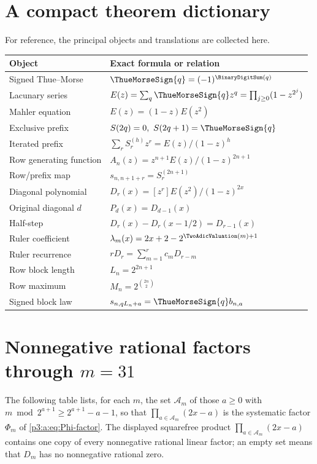 \documentclass[11pt,oneside]{article}
\numberwithin{equation}{section}
\theoremstyle{definition}
\theoremstyle{remark}
\begin{document}
\section{A compact theorem dictionary}\label{p3:app:dictionary}

For reference, the principal objects and translations are collected here.

\begin{center}
\begin{tabularx}{\textwidth}{@{}p{}X@{}}
\toprule
Object & Exact formula or relation \\
\midrule
Signed Thue--Morse & \(\ThueMorseSign{q}=(-1)^{\BinaryDigitSum(q)}\) \\
Lacunary series & \(E(z)=\sum_q\ThueMorseSign{q}z^q=\prod_{j\ge0}(1-z^{2^j})\) \\
Mahler equation & \(E(z)=(1-z)E(z^2)\) \\
Exclusive prefix & \(S(2q)=0,\ S(2q+1)=\ThueMorseSign{q}\) \\
Iterated prefix & \(\sum_r S_r^{(h)}z^r=E(z)/(1-z)^h\) \\
Row generating function & \(A_n(z)=z^{n+1}E(z)/(1-z)^{2n+1}\) \\
Row/prefix map & \(s_{n,n+1+r}=S_r^{(2n+1)}\) \\
Diagonal polynomial & \(D_r(x)=[z^r]E(z^2)/(1-z)^{2x}\) \\
Original diagonal \(d\) & \(P_d(x)=D_{d-1}(x)\) \\
Half-step & \(D_r(x)-D_r(x-1/2)=D_{r-1}(x)\) \\
Ruler coefficient & \(\lambda_m(x)=2x+2-2^{\TwoAdicValuation(m)+1}\) \\
Ruler recurrence & \(r D_r=\sum_{m=1}^rc_m D_{r-m}\) \\
Row block length & \(L_n=2^{2n+1}\) \\
Row maximum & \(M_n=2^{\binom{2n}{2}}\) \\
Signed block law & \(s_{n,qL_n+a}=\ThueMorseSign{q}b_{n,a}\) \\
\bottomrule
\end{tabularx}
\end{center}
\section{Nonnegative rational factors through \texorpdfstring{$m=31$}{m=31}}
\label{p3:b:app:factor-table}

The following table lists, for each $m$, the set $\mathcal A_m$ of those $a\ge0$ with $m\bmod 2^{a+1}\ge2^{a+1}-a-1$, so that $\prod_{a\in\mathcal A_m}(2x-a)$ is the systematic factor $\Phi_m$ of \eqref{p3:a:eq:Phi-factor}.  The displayed
squarefree product $\prod_{a\in\mathcal A_m}(2x-a)$ contains one copy of every
nonnegative rational linear factor; an empty set means that $D_m$ has no
nonnegative rational zero.
\end{document}
